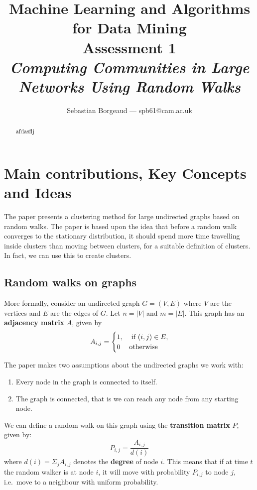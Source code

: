 \documentclass[12pt]{article}
\title{Machine Learning and Algorithms for Data Mining \\
Assessment 1 \\
\textit{Computing Communities in Large Networks Using Random Walks}}
\author{Sebastian Borgeaud --- spb61@cam.ac.uk}
\theoremstyle{definition}
\begin{document}
\maketitle

\begin{abstract}
	afdasflj	
\end{abstract}

\section{Main contributions, Key Concepts and Ideas}
The paper presents a clustering method for large undirected graphs based on random walks. The paper is based upon the idea that before a random walk converges to the stationary distribution, it should spend more time travelling inside clusters than moving between clusters, for a suitable definition of clusters. In fact, we can use this to create clusters.

\subsection{Random walks on graphs}
More formally, consider an undirected graph $G=(V,E)$ where $V$ are the vertices and $E$ are the edges of $G$. Let $n = |V|$ and $m = |E|$. This graph has an \textbf{adjacency matrix} $A$, given by
\[ 
A_{i,j} = 
\begin{cases}
	1, 	&\textnormal{ if $(i,j) \in E$},\\
	0	&\textnormal{otherwise}\\
\end{cases}
\]

The paper makes two assumptions about the undirected graphs we work with:
\begin{enumerate}
	\item Every node in the graph is connected to itself.
	\item The graph is connected, that is we can reach any node from any starting node.
\end{enumerate}

We can define a random walk on this graph using the \textbf{transition matrix} $P$, given by:
\begin{equation}
	P_{i,j} = \frac{A_{i,j}}{d(i)}
\end{equation}
where $d(i) = \Sigma_j A_{i,j}$ denotes the \textbf{degree} of node $i$. This means that if at time $t$ the random walker is at node $i$, it will move with probability $P_{i,j}$ to node $j$, i.e.\ move to a neighbour with uniform probability.
\end{document}

